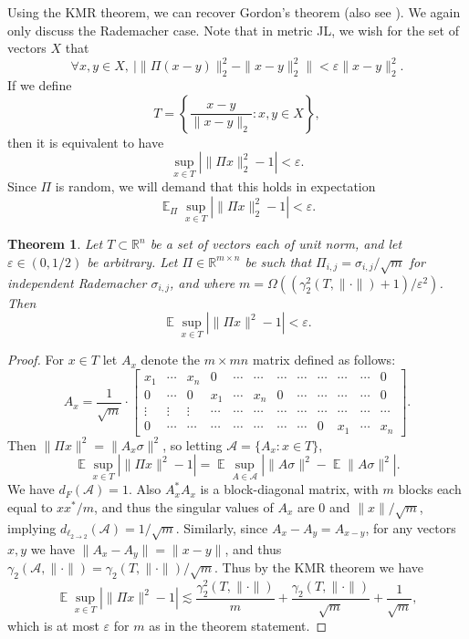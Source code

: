 \documentclass[12pt]{article}
\DeclareMathOperator*{\E}{\mathbb{E}}
\newcommand{\eps}{\varepsilon}
\newcommand{\R}{\mathbb{R}}
\newtheorem{theorem}{Theorem}
\newcommand{\EquationName}[1]{\label{eq:#1}}
\begin{document}
Using the KMR theorem, we can recover Gordon's theorem \cite{Gordon88} (also see \cite{KlartagM05,MendelsonPTJ07,Dirksen14}). We again only discuss the Rademacher case. Note that in metric JL, we wish for the set of vectors $X$ that
$$
\forall x,y\in X,\ | \|\Pi (x-y)\|_2^2 - \|x - y\|_2^2 \| < \eps\|x-y\|_2^2 .
$$
If we define
$$
T = \left\{\frac{x-y}{\|x-y\|_2} : x,y\in X\right\} ,
$$
then it is equivalent to have
$$
\sup_{x\in T} | \|\Pi x\|_2^2 - 1 | < \eps .
$$
Since $\Pi$ is random, we will demand that this holds in expectation
\begin{equation}\EquationName{mjl}
\E_\Pi \sup_{x\in T} | \|\Pi x\|_2^2 - 1 | < \eps .
\end{equation}

\begin{theorem}\label{thm:jl}
Let $T\subset \R^n$ be a set of vectors each of unit norm, and let $\eps\in (0,1/2)$ be arbitrary. Let $\Pi\in\R^{m\times n}$ be such that $\Pi_{i,j} = \sigma_{i,j}/\sqrt{m}$ for independent Rademacher $\sigma_{i,j}$, and where $m = \Omega((\gamma_2^2(T, \|\cdot\|) + 1) / \eps^2)$. Then
$$ \E \sup_{x\in T} \left|\|\Pi x\|^2 - 1 \right| < \eps .$$
\end{theorem}
\begin{proof}
For $x\in T$ let $A_x$ denote the $m\times mn$ matrix defined as follows:
\begin{equation*}
A_x = \frac{1}{\sqrt{m}}\cdot \left[
\begin{array}{cccccccccccc}
x_1 & \cdots & x_n & 0 & \cdots & \cdots & \cdots & \cdots & \cdots &\cdots &\cdots &0\\
0 & \cdots & 0 & x_1 & \cdots & x_n & 0 & \cdots & \cdots &\cdots &\cdots &0\\
\vdots &\vdots &\vdots &\cdots &\cdots &\cdots &\cdots &\cdots &\cdots &\cdots &\cdots &\cdots\\
0 & \cdots & \cdots & \cdots & \cdots  & \cdots& \cdots& \cdots& 0 & x_1 & \cdots & x_n
\end{array}
\right] .
\end{equation*}
Then $\|\Pi x\|^2 = \|A_x \sigma\|^2$, so letting $\mathcal{A} = \{A_x : x\in T\}$,
$$ \E \sup_{x\in T} \left|\|\Pi x\|^2 - 1 \right| = \E \sup_{A\in\mathcal{A}} \left|\|A \sigma\|^2 - \E \|A\sigma\|^2 \right| .$$
We have $d_F(\mathcal{A}) = 1$. Also $A_x^*A_x$ is a block-diagonal matrix, with $m$ blocks each equal to $xx^*/m$, and thus the singular values of $A_x$ are $0$ and $\|x\|/\sqrt{m}$, implying $d_{\ell_{2\rightarrow 2}}(\mathcal{A}) = 1/\sqrt{m}$. Similarly, since $A_x - A_y = A_{x-y}$, for any vectors $x,y$ we have  $\|A_x - A_y\| = \|x - y\|$, and thus $\gamma_2(\mathcal{A}, \|\cdot\|) = \gamma_2(T, \|\cdot\|)/\sqrt{m}$. Thus by the KMR theorem we have
$$ \E \sup_{x\in T} \left|\|\Pi x\|^2 - 1 \right| \lesssim \frac{\gamma_2^2(T, \|\cdot\|)}{m} + \frac{\gamma_2(T, \|\cdot\|)}{\sqrt{m}} + \frac{1}{\sqrt{m}} ,$$
which is at most $\eps$ for $m$ as in the theorem statement.
\end{proof}
\end{document}
